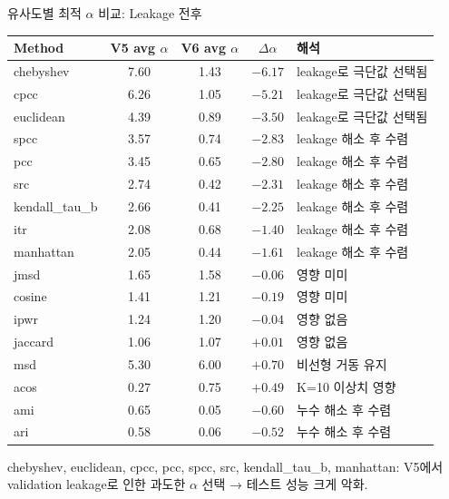 \documentclass[aspectratio=169,10pt]{beamer}
\begin{document}
\begin{frame}[shrink=8]{유사도별 최적 $\alpha$ 비교: Leakage 전후}
	\begin{center}
	\renewcommand{\arraystretch}{1.2}
	\begin{tabular}{l|c|c|c|l}
		\toprule
		\textbf{Method} & \textbf{V5 avg $\alpha$} & \textbf{V6 avg $\alpha$} & \textbf{$\Delta\alpha$} & \textbf{해석} \\
		\midrule
		chebyshev     & 7.60 & 1.43 & \textcolor{testgreen}{$-6.17$} & leakage로 극단값 선택됨 \\
		cpcc          & 6.26 & 1.05 & \textcolor{testgreen}{$-5.21$} & leakage로 극단값 선택됨 \\
		euclidean     & 4.39 & 0.89 & \textcolor{testgreen}{$-3.50$} & leakage로 극단값 선택됨 \\
		spcc          & 3.57 & 0.74 & \textcolor{testgreen}{$-2.83$} & leakage 해소 후 수렴 \\
		pcc           & 3.45 & 0.65 & \textcolor{testgreen}{$-2.80$} & leakage 해소 후 수렴 \\
		src           & 2.74 & 0.42 & \textcolor{testgreen}{$-2.31$} & leakage 해소 후 수렴 \\
		kendall\_tau\_b & 2.66 & 0.41 & \textcolor{testgreen}{$-2.25$} & leakage 해소 후 수렴 \\
		itr           & 2.08 & 0.68 & \textcolor{testgreen}{$-1.40$} & leakage 해소 후 수렴 \\
		manhattan     & 2.05 & 0.44 & \textcolor{testgreen}{$-1.61$} & leakage 해소 후 수렴 \\
		jmsd          & 1.65 & 1.58 & $-0.06$ & 영향 미미 \\
		cosine        & 1.41 & 1.21 & $-0.19$ & 영향 미미 \\
		ipwr          & 1.24 & 1.20 & $-0.04$ & 영향 없음 \\
		jaccard       & 1.06 & 1.07 & $+0.01$ & 영향 없음 \\
		msd           & 5.30 & 6.00 & $+0.70$ & 비선형 거동 유지 \\
		acos          & 0.27 & 0.75 & $+0.49$ & K=10 이상치 영향 \\
		ami           & 0.65 & 0.05 & \textcolor{testgreen}{$-0.60$} & 누수 해소 후 수렴 \\
		ari           & 0.58 & 0.06 & \textcolor{testgreen}{$-0.52$} & 누수 해소 후 수렴 \\
		\bottomrule
	\end{tabular}
	\end{center}
	{\scriptsize
	chebyshev, euclidean, cpcc, pcc, spcc, src, kendall\_tau\_b, manhattan: V5에서 validation leakage로 인한 과도한 $\alpha$ 선택 → 테스트 성능 크게 악화.
	}
\end{frame}
\end{document}
